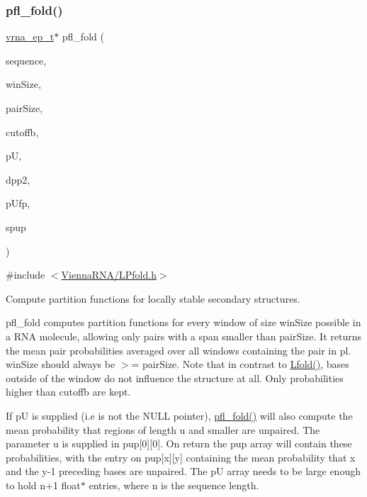 \subsubsection{\texorpdfstring{pfl\+\_\+fold()}{pfl\_fold()}}
{\footnotesize\ttfamily \hyperlink{group__struct__utils__plist_gab9ac98ab55ded9fb90043b024b915aca}{vrna\+\_\+ep\+\_\+t}$\ast$ pfl\+\_\+fold (\begin{DoxyParamCaption}\item[{char $\ast$}]{sequence,  }\item[{int}]{win\+Size,  }\item[{int}]{pair\+Size,  }\item[{float}]{cutoffb,  }\item[{double $\ast$$\ast$}]{pU,  }\item[{\hyperlink{group__struct__utils__plist_gab9ac98ab55ded9fb90043b024b915aca}{vrna\+\_\+ep\+\_\+t} $\ast$$\ast$}]{dpp2,  }\item[{F\+I\+LE $\ast$}]{p\+Ufp,  }\item[{F\+I\+LE $\ast$}]{spup }\end{DoxyParamCaption})}



{\ttfamily \#include $<$\hyperlink{LPfold_8h}{Vienna\+R\+N\+A/\+L\+Pfold.\+h}$>$}



Compute partition functions for locally stable secondary structures. 

pfl\+\_\+fold computes partition functions for every window of size \textquotesingle{}win\+Size\textquotesingle{} possible in a R\+NA molecule, allowing only pairs with a span smaller than \textquotesingle{}pair\+Size\textquotesingle{}. It returns the mean pair probabilities averaged over all windows containing the pair in \textquotesingle{}pl\textquotesingle{}. \textquotesingle{}win\+Size\textquotesingle{} should always be $>$= \textquotesingle{}pair\+Size\textquotesingle{}. Note that in contrast to \hyperlink{group__mfe__window__deprecated_gafdd1e11b5c7ad443b9f86b818e67bab4}{Lfold()}, bases outside of the window do not influence the structure at all. Only probabilities higher than \textquotesingle{}cutoffb\textquotesingle{} are kept.

If \textquotesingle{}pU\textquotesingle{} is supplied (i.\+e is not the N\+U\+LL pointer), \hyperlink{group__part__func__window__deprecated_ga7cdf690583871f9c158a0f91d4785cb6}{pfl\+\_\+fold()} will also compute the mean probability that regions of length \textquotesingle{}u\textquotesingle{} and smaller are unpaired. The parameter \textquotesingle{}u\textquotesingle{} is supplied in \textquotesingle{}pup\mbox{[}0\mbox{]}\mbox{[}0\mbox{]}\textquotesingle{}. On return the \textquotesingle{}pup\textquotesingle{} array will contain these probabilities, with the entry on \textquotesingle{}pup\mbox{[}x\mbox{]}\mbox{[}y\mbox{]}\textquotesingle{} containing the mean probability that x and the y-\/1 preceding bases are unpaired. The \textquotesingle{}pU\textquotesingle{} array needs to be large enough to hold n+1 float$\ast$ entries, where n is the sequence length.

